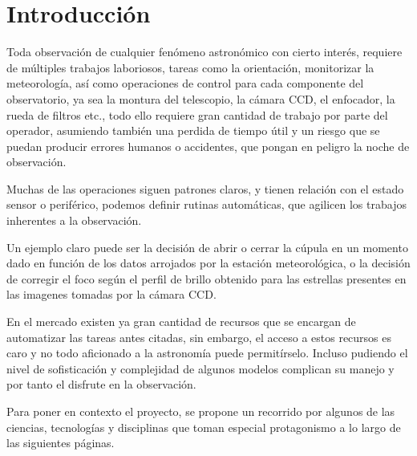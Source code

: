 \chapter{Introducción}

\bigskip
Toda observación de cualquier fenómeno astronómico con cierto interés, requiere de múltiples trabajos laboriosos, tareas  como  la orientación, monitorizar la  meteorología, así como operaciones de control para cada componente del observatorio, ya sea la montura del telescopio, la cámara CCD, el enfocador, la rueda de filtros etc., todo ello requiere gran cantidad de trabajo por parte del operador, asumiendo también una perdida de tiempo útil y un riesgo que se puedan producir errores humanos o accidentes, que pongan en peligro la noche de observación.

\bigskip
Muchas de las operaciones siguen patrones claros, y tienen relación con el estado sensor o periférico, podemos definir rutinas automáticas,
que agilicen los trabajos inherentes a la observación. 

\bigskip
Un ejemplo claro puede ser la decisión de abrir o cerrar la cúpula en un momento dado en función de los datos arrojados por la estación meteorológica, o la decisión de corregir el foco según el perfil de brillo obtenido para las estrellas presentes en las imagenes tomadas por la cámara CCD.

\bigskip
En el mercado existen ya gran cantidad de recursos que se encargan de automatizar las tareas antes citadas, sin embargo, el acceso a estos recursos es caro y no todo aficionado a la astronomía puede permitírselo. Incluso pudiendo el nivel de sofisticación y complejidad
de algunos modelos complican su manejo y por tanto el disfrute en la observación.


\newpage
\bigskip
Para poner en contexto el proyecto, se  propone un recorrido por algunos de las ciencias, tecnologías y disciplinas que toman especial  protagonismo a lo largo de las siguientes páginas.


